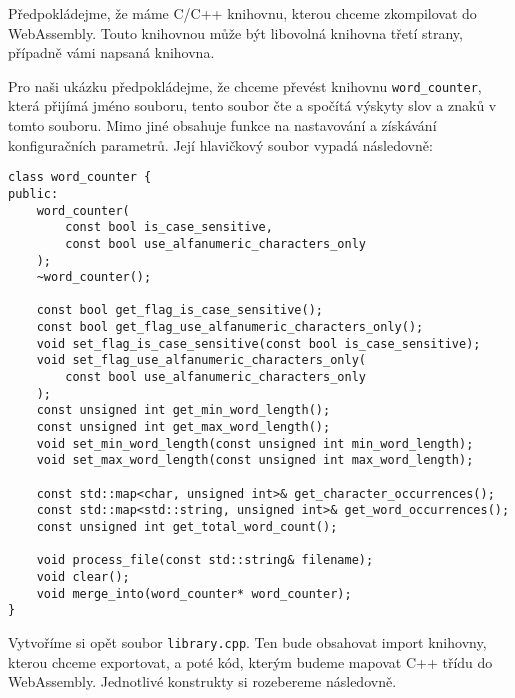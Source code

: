 \documentclass{{template/ctuthesis}}
\begin{document}
Předpokládejme, že máme C/C++ knihovnu, kterou chceme zkompilovat do WebAssembly. Touto knihovnou může být libovolná knihovna třetí strany, případně vámi napsaná knihovna.

Pro naši ukázku předpokládejme, že chceme převést knihovnu \texttt{word\_counter}, která přijímá jméno souboru, tento soubor čte a spočítá výskyty slov a znaků v tomto souboru. Mimo jiné obsahuje funkce na nastavování a získávání konfiguračních parametrů. Její hlavičkový soubor vypadá následovně:

\begin{verbatim}
class word_counter {
public:
    word_counter(
        const bool is_case_sensitive,
        const bool use_alfanumeric_characters_only
    );
    ~word_counter();
    
    const bool get_flag_is_case_sensitive();
    const bool get_flag_use_alfanumeric_characters_only();
    void set_flag_is_case_sensitive(const bool is_case_sensitive);
    void set_flag_use_alfanumeric_characters_only(
        const bool use_alfanumeric_characters_only
    );
    const unsigned int get_min_word_length();
    const unsigned int get_max_word_length();
    void set_min_word_length(const unsigned int min_word_length);
    void set_max_word_length(const unsigned int max_word_length);
    
    const std::map<char, unsigned int>& get_character_occurrences();
    const std::map<std::string, unsigned int>& get_word_occurrences();
    const unsigned int get_total_word_count();
    
    void process_file(const std::string& filename);
    void clear();
    void merge_into(word_counter* word_counter);
}
\end{verbatim}

Vytvoříme si opět soubor \texttt{library.cpp}. Ten bude obsahovat import knihovny, kterou chceme exportovat, a poté kód, kterým budeme mapovat C++ třídu do WebAssembly. Jednotlivé konstrukty si rozebereme následovně.
\end{document}
